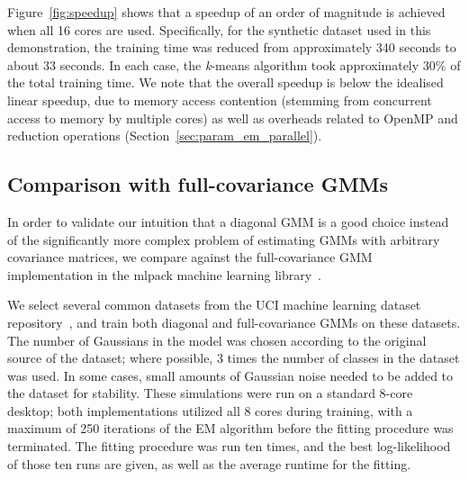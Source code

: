 Figure~\ref{fig:speedup} shows that a speedup of an order of magnitude is achieved when all 16 cores are used.
Specifically, for the synthetic dataset used in this demonstration,
the training time was reduced from approximately 340 seconds to about 33 seconds.
In each case, the {\it k}-means algorithm took approximately 30\% of the total training time.
We note that the overall speedup is below the idealised linear speedup,
due to memory access contention (stemming from concurrent access to memory by multiple cores)
as well as overheads related to OpenMP and reduction operations (Section~\ref{sec:param_em_parallel}).

\subsection{Comparison with full-covariance GMMs}


In order to validate our intuition that a diagonal GMM is a good choice instead
of the significantly more complex problem of estimating GMMs with arbitrary
covariance matrices, we compare against the full-covariance GMM implementation
in the mlpack machine learning library~\cite{Curtin_2013}.

We select several common datasets from the UCI machine learning dataset
repository~\cite{Lichman_2013}, and train both diagonal and full-covariance
GMMs on these datasets.  The number of Gaussians in the model was chosen
according to the original source of the dataset; where possible, 3 times the
number of classes in the dataset was used.  In some cases, small amounts of
Gaussian noise needed to be added to the dataset for stability.
These simulations were run on a standard 8-core desktop; both implementations
utilized all 8 cores during training, with a maximum of 250 iterations of the EM
algorithm before the fitting procedure was terminated.  The fitting procedure
was run ten times, and the best log-likelihood of those ten runs are given, as
well as the average runtime for the fitting.

